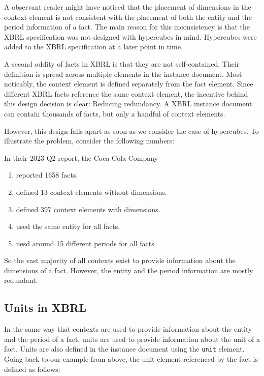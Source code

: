 A observant reader might have noticed that the placement of dimensions in the context element is not consistent with the placement of both the entity and the period information of a fact.
The main reason for this inconsistency is that the XBRL specification was not designed with hypercubes in mind.
Hypercubes were added to the XBRL specification at a later point in time.

A second oddity of facts in XBRL is that they are not self-contained. 
Their definition is spread across multiple elements in the instance document.
Most noticably, the context element is defined separately from the fact element.
Since different XBRL facts reference the same context element, the incentive behind this design decision is clear: Reducing redundancy.
A XBRL instance document can contain thousands of facts, but only a handful of context elements.

However, this design falls apart as soon as we consider the case of hypercubes.
To illustrate the problem, consider the following numbers:

In their 2023 Q2 report, the Coca Cola Company 

\begin{enumerate}
    \item reported 1658 facts.
    \item defined 13 context elements without dimensions.
    \item defined 397 context elements with dimensions.
    \item used the same entity for all facts.
    \item uesd around 15 different periods for all facts.
\end{enumerate}

So the vast majority of all contexts exist to provide information about the dimensions of a fact.
However, the entity and the period information are mostly redundant.

\subsection{Units in XBRL}

In the same way that contexts are used to provide information about the entity and the period of a fact, units are used to provide information about the unit of a fact.
Units are also defined in the instance document using the \texttt{unit} element.
Going back to our example from above, the unit element referenced by the fact is defined as follows:


